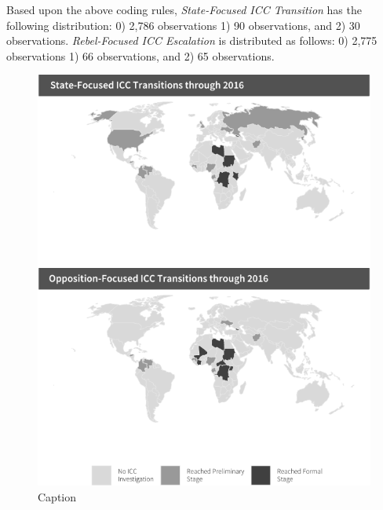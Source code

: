 
Based upon the above coding rules, \emph{State-Focused ICC Transition} has the following distribution: 0) 2,786 observations 1) 90 observations, and 2) 30 observations. \emph{Rebel-Focused ICC Escalation} is distributed as follows: 0) 2,775 observations 1) 66 observations, and 2) 65 observations.

\begin{figure}
    \centering
    \includegraphics[width=1\textwidth]{iccMaps.pdf}
    \caption{Caption}
    \label{fig:iccMaps}
\end{figure}
\FloatBarrier

